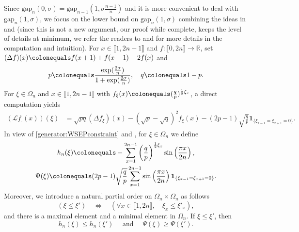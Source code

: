 \documentclass[reqno,11pt]{amsart}
\numberwithin{equation}{section}
\newcommand{\bbR}{{\ensuremath{\mathbb R}} }
\newcommand{\gO}{\Omega}
\newcommand{\gs}{\sigma}
\newcommand{\cL}{{\ensuremath{\mathcal L}} }
\newcommand{\ind}{\mathbf{1}}
\newcommand{\lint}{\llbracket}
\newcommand{\rint}{\rrbracket}
\newcommand{\Gap}{\mathrm{gap}}
\begin{document}
Since $\Gap_n(0, \gs)=\Gap_{n-1}(1,\gs \frac{n-1}{n})$ and it is more convenient to deal with $\Gap_n(1, \gs)$,
we focus on the lower bound on $\Gap_{n}(1, \sigma)$ combining the ideas in \cite{labbe2016cutoff} and \cite{caputo2008approach} (since this is not a new argument, our proof while complete, keeps the level of details at  minimum, we refer the readers to \cite[section 3.3]{labbe2016cutoff} and \cite[Section 4]{caputo2008approach} for more details in the computation and intuition).
For $x \in \lint 1, 2n-1 \rint$ and $f: \lint 0, 2n \rint \to \bbR$, set $(\Delta f)(x) \colonequals f(x+1)+f(x-1)-2f(x)$ and
\begin{equation*}
 p \colonequals \frac{ \exp(\tfrac{2\sigma}{n})}{1+\exp(\tfrac{2\sigma}{n})}, \quad q \colonequals 1-p.
\end{equation*}   
For $\xi \in \Omega_n$ and $x \in \lint 1, 2n-1 \rint$ with $f_{\xi}(x)\colonequals ( \frac{q}{p})^{\frac{1}{2}\xi_x}$, a direct computation yields
\begin{equation}\label{generator:WSEPconstraint}
\begin{aligned}
(\cL f_{\cdot}(x))(\xi)
&=\sqrt{pq} (\Delta f_{\xi})(x)-(\sqrt{p}-\sqrt{q})^2 f_{\xi}(x)-(2p-1)\sqrt{\frac{q}{p}} \ind_{ \{\xi_{x-1}=\xi_{x+1}=0 \}}.
\end{aligned}
\end{equation}
In view of \eqref{generator:WSEPconstraint} and \cite[Subsection 3.3]{labbe2016cutoff}, for $\xi \in \gO_n$ we define
 \begin{equation}
 \begin{gathered}
 h_n(\xi) \colonequals -\sum_{x=1}^{2n-1} \left(\frac{q}{p} \right)^{\frac{1}{2}\xi_x} \sin\left(\frac{\pi x}{2n}\right) ,\\
 \Psi(\xi) \colonequals (2p-1)\sqrt{\frac{q}{p}}\sum_{x=1}^{2n-1} \sin \left( \frac{\pi x}{2n} \right) \ind_{\{ \xi_{x-1}=\xi_{x+1}=0 \}}.
\end{gathered} 
 \end{equation}
Moreover, we introduce a natural partial order on $\gO_n \times \gO_n$ as follows
\begin{equation*}
\left ( \xi \le \xi'\right) \quad \Leftrightarrow \quad \left(\forall x \in \lint 1, 2n \rint, \quad \xi_x \le \xi'_x \right),
\end{equation*}
and there is a maximal element and a minimal element in $\gO_n$.
 If $\xi \le \xi'$, then 
\begin{equation*}
h_n(\xi) \le h_n(\xi') \quad  \text{ and } \quad \Psi(\xi) \ge \Psi(\xi').
\end{equation*}
\end{document}
